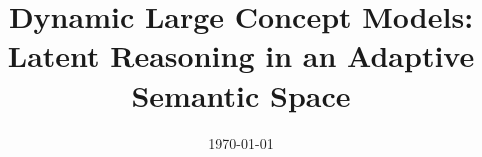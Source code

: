 \documentclass[]{bytedance_seed}
\title{ Dynamic Large Concept Models: Latent Reasoning in an Adaptive Semantic Space }
\affiliation[1]{ByteDance Seed}
\affiliation[2]{University of Manchester}
\affiliation[3]{Mila - Quebec AI Institute}
\affiliation[4]{Tsinghua University }
\affiliation[5]{M-A-P}
\date{\today}
\begin{document}
\maketitle








\clearpage




\clearpage

\beginappendix


\end{document}
